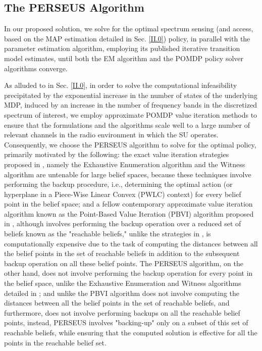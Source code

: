 \documentclass[12pt, draftcls, onecolumn]{IEEEtran}
\begin{document}
\subsection{The PERSEUS Algorithm}\label{II.II}
In our proposed solution, we solve for the optimal spectrum sensing (and access, based on the MAP estimation detailed in Sec. \ref{II.0}) policy, in parallel with the parameter estimation algorithm, employing its published iterative transition model estimates, until both the EM algorithm and the POMDP policy solver algorithms converge.

As alluded to in Sec. \ref{II.0}, in order to solve the computational infeasibility precipitated by the exponential increase in the number of states of the underlying MDP, induced by an increase in the number of frequency bands in the discretized spectrum of interest, we employ approximate POMDP value iteration methods to ensure that the formulations and the algorithms scale well to a large number of relevant channels in the radio environment in which the SU operates. Consequently, we choose the PERSEUS algorithm \cite{WCL:13} to solve for the optimal policy, primarily motivated by the following: the exact value iteration strategies proposed in \cite{PUOccupancy:18}, namely the Exhaustive Enumeration algorithm and the Witness algorithm are untenable for large belief spaces, because these techniques involve performing the backup procedure, i.e., determining the optimal action (or hyperplane in a Piece-Wise Linear Convex (PWLC) context) for every belief point in the belief space; and a fellow contemporary approximate value iteration algorithm known as the Point-Based Value Iteration (PBVI) algorithm proposed in \cite{PUOccupancy:17}, although involves performing the backup operation over a reduced set of beliefs known as the "reachable beliefs," unlike the strategies in \cite{PUOccupancy:17}, is computationally expensive due to the task of computing the distances between all the belief points in the set of reachable beliefs in addition to the subsequent backup operation on all these belief points. The PERSEUS algorithm, on the other hand, does not involve performing the backup operation for every point in the belief space, unlike the Exhaustive Enumeration and Witness algorithms detailed in \cite{PUOccupancy:18}; and unlike the PBVI algorithm \cite{PUOccupancy:17} does not involve computing the distances between all the belief points in the set of reachable beliefs, and furthermore, does not involve performing backups on all the reachable belief points, instead, PERSEUS involves "backing-up" only on a subset of this set of reachable beliefs, while ensuring that the computed solution is effective for all the points in the reachable belief set.
\end{document}
